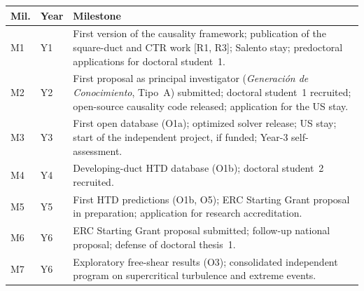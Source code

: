 \documentclass[11pt]{article}
\begin{document}
\begin{center}\small
\begin{tabularx}{\textwidth}{@{}p{0.8cm}p{1.35cm}X@{}}
\toprule
\textbf{Mil.} & \textbf{Year} & \textbf{Milestone} \\
\midrule
M1 & Y1 & First version of the causality framework; publication of the square-duct and CTR work [R1, R3]; Salento stay; predoctoral applications for doctoral student~1. \\
M2 & Y2 & First proposal as principal investigator (\emph{Generaci\'on de Conocimiento}, Tipo~A) submitted; doctoral student~1 recruited; open-source causality code released; application for the US stay. \\
M3 & Y3 & First open database (O1a); optimized solver release; US stay; start of the independent project, if funded; Year-3 self-assessment. \\
M4 & Y4 & Developing-duct HTD database (O1b); doctoral student~2 recruited. \\
M5 & Y5 & First HTD predictions (O1b, O5); ERC Starting Grant proposal in preparation; application for research accreditation. \\
M6 & Y6 & ERC Starting Grant proposal submitted; follow-up national proposal; defense of doctoral thesis~1. \\
M7 & Y6 & Exploratory free-shear results (O3); consolidated independent program on supercritical turbulence and extreme events. \\
\bottomrule
\end{tabularx}
\end{center}
\end{document}
